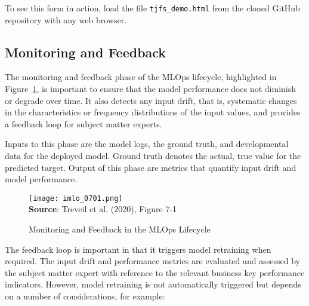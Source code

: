 To see this form in action, load the file \texttt{tjfs\_demo.html} from the cloned GitHub repository with any web browser.

\subsection{Monitoring and Feedback}

The monitoring and feedback phase of the MLOps lifecycle, highlighted in Figure~\ref{fig:monitoringfeedback}, is important to ensure that the model performance does not diminish or degrade over time. It also detects any input drift, that is, systematic changes in the characteristics or frequency distributions of the input values, and provides a feedback loop for subject matter experts.

Inputs to this phase are the model logs, the ground truth, and developmental data for the deployed model. Ground truth denotes the actual, true value for the predicted target. Output of this phase are metrics that quantify input drift and model performance. 

\begin{figure}
\centering
\texttt{[image: imlo\_0701.png]} \\

\vspace{\baselineskip}
\scriptsize \textbf{Source}: Treveil et al. (2020), Figure 7-1
\caption{Monitoring and Feedback in the MLOps Lifecycle}
\label{fig:monitoringfeedback}
\end{figure}

The feedback loop is important in that it triggers model retraining when required. The input drift and performance metrics are evaluated and assessed by the subject matter expert with reference to the relevant business key performance indicators. However, model retraining is not automatically triggered but depends on a number of considerations, for example:

